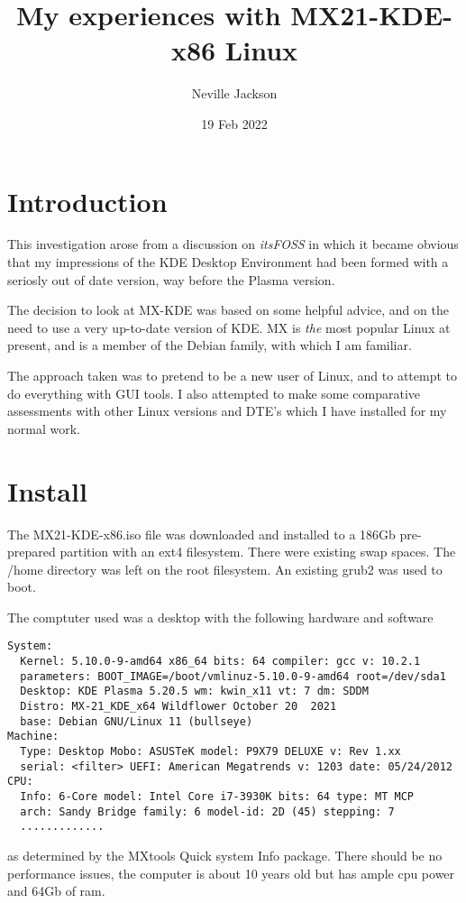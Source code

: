 \documentclass{article}  %
\title{My experiences with MX21-KDE-x86 Linux}
\author{Neville Jackson}
\date{19 Feb 2022}
\begin{document}
 

\maketitle      

\section{Introduction} 
This investigation arose from a discussion on {\em itsFOSS} in which it became obvious that my impressions of the KDE Desktop Environment had been formed with a seriosly out of date version, way before the Plasma version. 

The decision to look at MX-KDE was based on some helpful advice, and on the need to use a very up-to-date version of KDE. MX is {\em the} most popular Linux at present, and is a member of the Debian family, with which I am familiar.

The approach taken was to pretend to be a new user of Linux, and to attempt to do everything with GUI tools. 
I also attempted to make some comparative assessments with other Linux versions and DTE's which I have installed for my normal work.

\section{Install}
The MX21-KDE-x86.iso file was downloaded and installed to a 186Gb pre-prepared partition with an ext4 filesystem. There were existing swap spaces. The /home directory was left on the root filesystem. An existing grub2 was used to boot.

The comptuter used  was a desktop with the following hardware and software
\begin{verbatim}
System:
  Kernel: 5.10.0-9-amd64 x86_64 bits: 64 compiler: gcc v: 10.2.1 
  parameters: BOOT_IMAGE=/boot/vmlinuz-5.10.0-9-amd64 root=/dev/sda1 
  Desktop: KDE Plasma 5.20.5 wm: kwin_x11 vt: 7 dm: SDDM 
  Distro: MX-21_KDE_x64 Wildflower October 20  2021 
  base: Debian GNU/Linux 11 (bullseye) 
Machine:
  Type: Desktop Mobo: ASUSTeK model: P9X79 DELUXE v: Rev 1.xx 
  serial: <filter> UEFI: American Megatrends v: 1203 date: 05/24/2012 
CPU:
  Info: 6-Core model: Intel Core i7-3930K bits: 64 type: MT MCP 
  arch: Sandy Bridge family: 6 model-id: 2D (45) stepping: 7 
  .............
\end{verbatim}
as determined by the MXtools Quick system Info package. 
There should be no performance issues, the computer is about 10 years old but has ample cpu power and 64Gb of ram.
\end{document}
